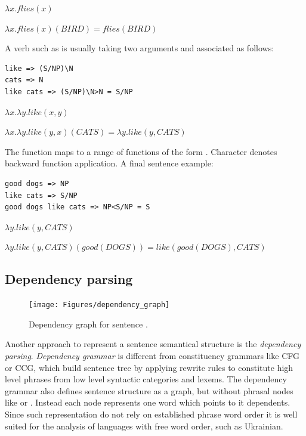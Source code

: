 $\lambda x.flies(x)$

$\lambda x.flies(x)(BIRD)=flies(BIRD) $

A verb such as  is usually taking two arguments and associated as follows:

\begin{verbatim}
like => (S/NP)\N
cats => N
like cats => (S/NP)\N>N = S/NP
\end{verbatim}

$\lambda x.\lambda y.like(x, y)$

$\lambda x.\lambda y.like(y, x)(CATS)=\lambda y.like(y, CATS)$

The function  maps  to a range of functions of the form . Character \code{<} denotes backward function application. A final sentence example:

\begin{verbatim}
good dogs => NP
like cats => S/NP
good dogs like cats => NP<S/NP = S
\end{verbatim}

$\lambda y.like(y, CATS)$

$\lambda y.like(y, CATS)(good(DOGS))=like(good(DOGS), CATS)$

\subsection{Dependency parsing}

\begin{figure}[h]
\centering
\texttt{[image: Figures/dependency\_graph]}
\decoRule
\caption[Dependency graph]{Dependency graph for sentence \protect\footnotemark.}
\label{fig:dependency_graph}
\end{figure}


Another approach to represent a sentence semantical structure is the \emph{dependency parsing}. \emph{Dependency grammar} is different from constituency grammars like CFG or CCG, which build sentence tree by applying rewrite rules to constitute high level phrases from low level syntactic categories and lexems. The dependency grammar also defines sentence structure as a graph, but without phrasal nodes like  or . Instead each node represents one word which points to it dependents. Since such representation do not rely on established phrase word order it is well suited for the analysis of languages with free word order, such as Ukrainian.

